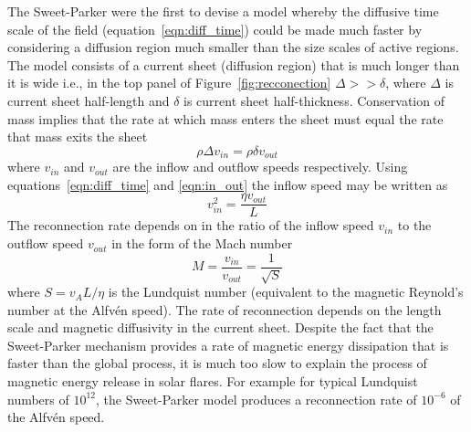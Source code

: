 The Sweet-Parker were the first to devise a model whereby the diffusive time scale of the field (equation~\ref{eqn:diff_time}) could be made much faster by considering a diffusion region much smaller than the size scales of active regions. The model consists of a current sheet (diffusion region) that is much longer than it is wide i.e., in the top panel of Figure~\ref{fig:recconection} $\Delta>>\delta$, where $\Delta$ is current sheet half-length and $\delta$ is current sheet half-thickness. Conservation of mass implies that the rate at which mass enters the sheet must equal the rate that mass exits the sheet
\begin{equation}
\rho \Delta v_{in} = \rho \delta v_{out}
\label{eqn:in_out}
\end{equation}
where $v_{in}$ and $v_{out}$ are the inflow and outflow speeds respectively. Using equations~\ref{eqn:diff_time} and \ref{eqn:in_out} the inflow speed may be written as
\begin{equation}
v_{in}^2 = \frac{\eta v_{out}}{L}
\end{equation}
The reconnection rate depends on in the ratio of the inflow speed $v_{in}$ to the outflow speed $v_{out}$ in the form of the Mach number
\begin{equation}
M = \frac{v_{in}}{v_{out}} = \frac{1}{\sqrt{S}}
\end{equation}
where $S=v_AL/\eta$ is the Lundquist number (equivalent to the magnetic Reynold's number at the Alfv\'{e}n speed). The rate of reconnection depends on the length scale and magnetic diffusivity in the current sheet. Despite the fact that the Sweet-Parker mechanism provides a rate of magnetic energy dissipation that is faster than the global process, it is much too slow to explain the process of magnetic energy release in solar flares. For example for typical Lundquist numbers of $10^{12}$, the Sweet-Parker model produces a reconnection rate of $10^{-6}$ of the Alfv\'{e}n speed.

